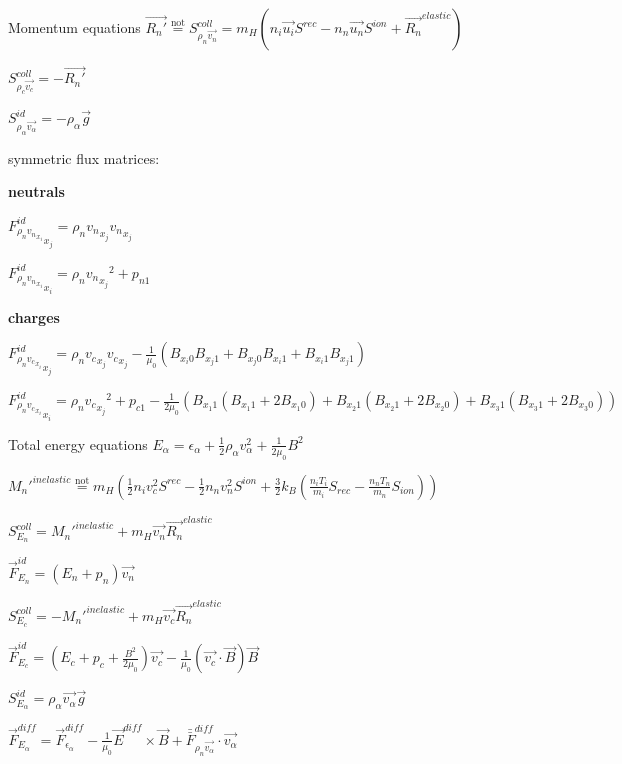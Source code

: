 \documentclass{beamer}
\begin{document}
\begin{frame}{Momentum equations}
$\vec{R_n'} \stackrel{\text{not}}{=} S_{\rho_n \vec{v_n}}^{coll} =  m_H(n_i \vec{u_i} S^{rec} - n_n \vec{u_n} S^{ion} +\vec{R_n}^{elastic})$

$S_{\rho_c \vec{v_c}}^{coll} =  -\vec{R_n'} $ 

$S_{\rho_\alpha \vec{v_\alpha}}^{id} = -\rho_\alpha \vec{g}$

symmetric flux matrices:

\textbf{neutrals}

${F_{\rho_{n}{v_n}_{x_i}}^{id}}_{x_j} = \rho_n {v_n}_{x_j} {v_n}_{x_j}  $ 

${F_{\rho_{n}{v_n}_{x_i}}^{id}}_{x_i} = \rho_n {{v_n}_{x_j}}^2 + p_{n1}  $

\textbf{charges}
 
${F_{\rho_{n}{v_c}_{x_i}}^{id}}_{x_j} = \rho_n {v_c}_{x_j} {v_c}_{x_j} - \frac{1}{\mu_0}(B_{x_i 0}B_{x_j 1} + B_{x_j0}B_{x_i1}  + B_{x_i1}B_{x_j1}  ) $ 

${F_{\rho_{n}{v_c}_{x_i}}^{id}}_{x_i} = \rho_n {{v_c}_{x_j}}^2 + p_{c1}  - \frac{1}{2 \mu_0}(B_{x_1 1} (B_{x_1 1} + 2  B_{x_1 0} )+ B_{x_2 1} (B_{x_2 1} + 2  B_{x_2 0} ) + B_{x_3 1} (B_{x_3 1} + 2  B_{x_3 0} ))$

\end{frame}


\begin{frame}{Total energy equations}
$E_\alpha = \epsilon_\alpha + \frac{1}{2} \rho_\alpha v_\alpha^2 + \frac{1}{2\mu_0} B^2$

${M_n'}^{inelastic} \stackrel{\text{not}}{=} m_H (\frac{1}{2} n_i v_c^2 S^{rec} - \frac{1}{2} n_n v_n^2 S^{ion} + \frac{3}{2} k_B (\frac{n_i T_i}{m_i} S_{rec} - \frac{n_n T_n}{m_n} S_{ion}))$ 

$S_{E_{n}}^{coll}  = {M_n'}^{inelastic}+ m_H \vec{v_n} \vec{R_n}^{elastic}$

$\vec{F}_{E_{n}}^{id} = (E_n + p_n) \vec{v_n}  $ 

$S_{E_{c}}^{coll} = -{M_n'}^{inelastic} + m_H \vec{v_c} \vec{R_n}^{elastic} $

$\vec{F}_{E_{c}}^{id} = (E_c + p_c + \frac{B^2}{2 \mu_0}) \vec{v_c} - \frac{1}{\mu_0} (\vec{v_c}\cdot\vec{B}) \vec{B} $

$S_{E_{\alpha}}^{id} = \rho_\alpha \vec{v_\alpha} \vec{g} $

$\vec{F}_{E_{\alpha}}^{diff}  = \vec{F}_{\epsilon_{\alpha}}^{diff} - \frac{1}{\mu_0} \vec{E}^{diff}  \times \vec{B} + \bar{\bar{F}}_{\rho_{n}\vec{v_\alpha}}^{diff} \cdot \vec{v_\alpha} $ 
\end{frame}
\end{document}
